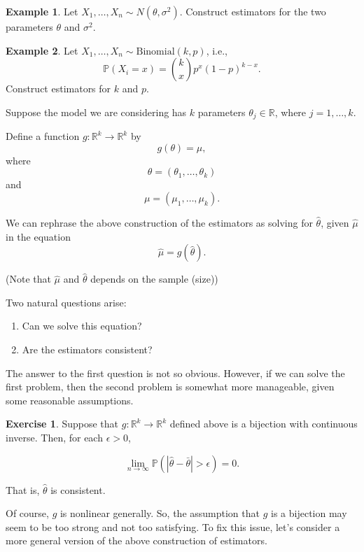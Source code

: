 \documentclass[
  openany]{book}
\theoremstyle{definition}
\theoremstyle{definition}
\newtheorem{example}{Example}[chapter]
\theoremstyle{definition}
\newtheorem{exercise}{Exercise}[chapter]
\theoremstyle{definition}
\theoremstyle{remark}
\begin{document}
\begin{example}
Let \(X_1, \dots, X_n \sim N(\theta, \sigma^2)\).
Construct estimators for the two parameters \(\theta\) and \(\sigma^2\).
\end{example}

\begin{example}
Let \(X_1, \dots, X_n \sim \mathrm{Binomial}(k,p)\), i.e.,
\[ \mathbb{P}(X_i = x) ={k \choose x} p^x (1-p)^{k-x}. \]
Construct estimators for \(k\) and \(p\).
\end{example}

Suppose the model we are considering has \(k\) parameters \(\theta_j \in \mathbb{R}\),
where \(j = 1, \dots, k\).

Define a function \(g: \mathbb{R}^k \to \mathbb{R}^k\) by
\[ g(\theta) = \mu, \]
where
\[\theta = (\theta_1, \dots, \theta_k)\]
and
\[\mu = (\mu_1, \dots, \mu_k).\]

We can rephrase the above construction of the estimators
as solving for \(\hat \theta\), given \(\hat \mu\) in the equation
\begin{equation}
 \hat \mu = g(\hat \theta) .
 \label{eq:estimator}
 \end{equation}

(Note that \(\hat \mu\) and \(\hat \theta\) depends on the sample (size))

Two natural questions arise:

\begin{enumerate}
\def\labelenumi{\arabic{enumi}.}
\item
  Can we solve this equation?
\item
  Are the estimators consistent?
\end{enumerate}

The answer to the first question is not so obvious.
However, if we can solve the first problem, then the second problem is
somewhat more manageable, given some reasonable assumptions.

\begin{exercise}
Suppose that \(g:\mathbb{R}^k \to \mathbb{R}^k\) defined above is a bijection with continuous inverse.
Then, for each \(\epsilon >0\),

\[\lim_{n\to \infty}\mathbb{P}( |\hat \theta - \bar \theta|   >  \epsilon) =0.\]

That is, \(\hat \theta\) is consistent.
\end{exercise}

Of course, \(g\) is nonlinear generally. So, the assumption that \(g\) is a bijection may seem to
be too strong and not too satisfying.
To fix this issue, let's consider a more general version of the above construction of estimators.
\end{document}
